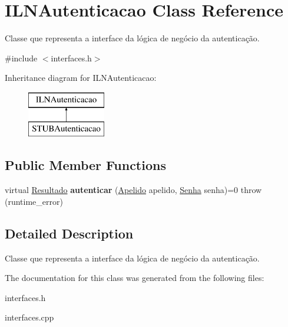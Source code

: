 \hypertarget{classILNAutenticacao}{}\section{I\+L\+N\+Autenticacao Class Reference}
\label{classILNAutenticacao}


Classe que representa a interface da lógica de negócio da autenticação.  




{\ttfamily \#include $<$interfaces.\+h$>$}

Inheritance diagram for I\+L\+N\+Autenticacao\+:\begin{figure}[H]
\begin{center}
\leavevmode
\includegraphics[height=2.000000cm]{classILNAutenticacao}
\end{center}
\end{figure}
\subsection*{Public Member Functions}
\begin{DoxyCompactItemize}
\item 
\mbox{\label{classILNAutenticacao_a4346605515dae4acdc80c9f54778d794}} 
virtual \hyperlink{classResultado}{Resultado} {\bfseries autenticar} (\hyperlink{classApelido}{Apelido} apelido, \hyperlink{classSenha}{Senha} senha)=0  throw (runtime\+\_\+error)
\end{DoxyCompactItemize}


\subsection{Detailed Description}
Classe que representa a interface da lógica de negócio da autenticação. 

The documentation for this class was generated from the following files\+:\begin{DoxyCompactItemize}
\item 
interfaces.\+h\item 
interfaces.\+cpp\end{DoxyCompactItemize}
